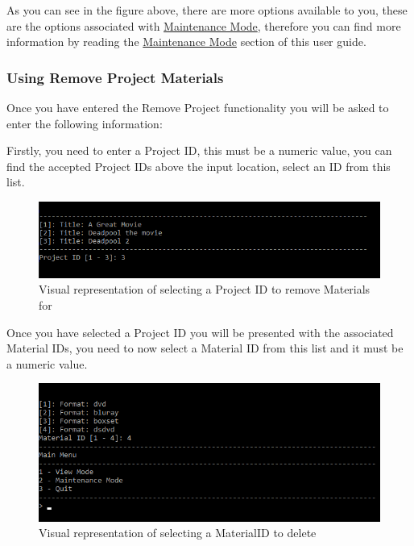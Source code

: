 \documentclass[
  english,
  a4paper,
,tablecaptionabove
]{scrartcl}
\begin{document}
As you can see in the figure above, there are more options available to
you, these are the options associated with
\protect\hyperlink{using-maintenance-mode}{Maintenance Mode}, therefore
you can find more information by reading the
\protect\hyperlink{using-maintenance-mode}{Maintenance Mode} section of
this user guide.

\newpage

\hypertarget{using-remove-project-materials}{%
\subsubsection{Using Remove Project
Materials}\label{using-remove-project-materials}}

Once you have entered the Remove Project functionality you will be asked
to enter the following information:

Firstly, you need to enter a Project ID, this must be a numeric value,
you can find the accepted Project IDs above the input location, select
an ID from this list.

\begin{figure}
\centering
\includegraphics{images/user-guide/maintenance-mode/remove-project-select-id.png}
\caption{Visual representation of selecting a Project ID to remove
Materials for}
\end{figure}

Once you have selected a Project ID you will be presented with the
associated Material IDs, you need to now select a Material ID from this
list and it must be a numeric value.

\begin{figure}
\centering
\includegraphics{images/user-guide/maintenance-mode/remove-project-materials-select-id.png}
\caption{Visual representation of selecting a MaterialID to delete}
\end{figure}
\end{document}
